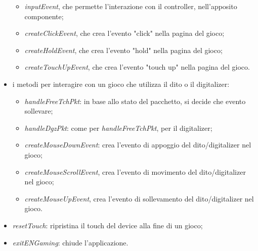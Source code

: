 \begin{itemize}
\begin{itemize}
        \item \emph{inputEvent}, che permette l'interazione con il controller, nell'apposito componente;
        \item \emph{createClickEvent}, che crea l'evento "click" nella pagina del gioco;
        \item \emph{createHoldEvent}, che crea l'evento "hold" nella pagina del gioco;
        \item \emph{createTouchUpEvent}, che crea l'evento "touch up" nella pagina del gioco.
    \end{itemize}
    \item i metodi per interagire con un gioco che utilizza il dito o il digitalizer: \begin{itemize}
        \item \emph{handleFreeTchPkt}: in base allo stato del pacchetto, si decide che evento sollevare;
        \item \emph{handleDgzPkt}: come per \emph{handleFreeTchPkt}, per il digitalizer;
        \item \emph{createMouseDownEvent}: crea l'evento di appoggio del dito/digitalizer nel gioco;
        \item \emph{createMouseScrollEvent}, crea l'evento di movimento del dito/digitalizer nel gioco;
        \item \emph{createMouseUpEvent}, crea l'evento di sollevamento del dito/digitalizer nel gioco.
    \end{itemize}
    \item \emph{resetTouch}: ripristina il touch del device alla fine di un gioco;
    \item \emph{exitENGaming}: chiude l'applicazione.
\end{itemize}
\newpage
